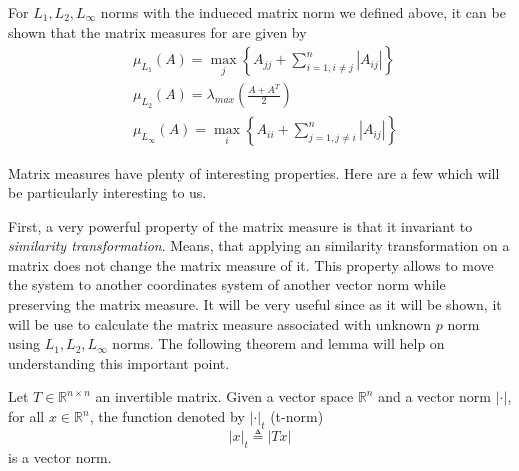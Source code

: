 \documentclass[12pt,English]{article}
\begin{document}
For $L_{1},L_{2},L_{\infty}$ norms with the indueced matrix norm we defined above, it can be shown that the matrix measures for are given by\footnotemark
\begin{align}
&\mu_{L_1}\left(A\right)=\max_{j}\left\{ A_{jj}+\sum_{i=1,i\ne j}^{n}\left|A_{ij}\right|\right\}
\\
&\mu_{L_2}\left(A\right)=\lambda_{max}\left(\frac{A+A^{T}}{2}\right)
\\
&\mu_{L_\infty}\left(A\right)=\max_{i}\left\{ A_{ii}+\sum_{j=1,j\ne i}^{n}\left|A_{ij}\right|\right\}
\end{align}



Matrix measures have plenty of interesting properties. Here are a few which
will be particularly interesting to us.

First,  a very powerful property of the matrix measure  is that it invariant to \textit{similarity transformation}. Means, that applying an similarity transformation on a matrix does not change the matrix measure of it. This property allows to move the system to another coordinates system of another vector norm while preserving the matrix measure. It will be very useful since as it will be shown, it will be use to calculate the matrix measure associated with unknown $p$ norm using $L_{1},L_{2},L_{\infty}$ norms.
The following theorem and lemma will help on understanding this important point.

\begin{thm}
Let $T\in\mathbb{R}^{n\times n}$ an invertible matrix.
Given a vector space $\mathbb{R}^{n}$ and a vector norm $\left|\cdot\right|$, for all $x\in\mathbb{R}^{n}$,  the function denoted by $\left|\cdot\right|_{t}$ (t-norm)
\begin{equation}
    \left|x\right|_{t}\triangleq\left|Tx\right|
\end{equation}
is a vector norm.
\end{thm}
\end{document}
